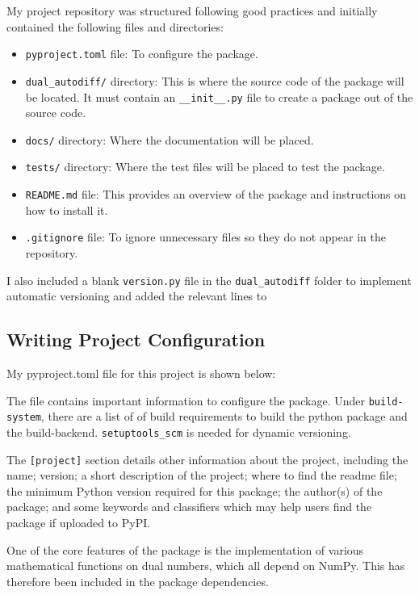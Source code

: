 \documentclass{article}
\begin{document}
My project repository was structured following good practices and initially contained the following files and directories:
\begin{itemize}
    \item \texttt{pyproject.toml} file: To configure the package.
    \item \texttt{dual\_autodiff/} directory: This is where the source code of the package will be located. It must contain an \texttt{\_\_init\_\_.py} file to create a package out of the source code.
    \item \texttt{docs/} directory: Where the documentation will be placed.
    \item \texttt{tests/} directory: Where the test files will be placed to test the package.
    \item \texttt{README.md} file: This provides an overview of the package and instructions on how to install it.
    \item \texttt{.gitignore} file: To ignore unnecessary files so they do not appear in the repository.
\end{itemize}

I also included a blank \texttt{version.py} file in the \texttt{dual\_autodiff} folder to implement automatic versioning and added the relevant lines to

\subsection{Writing Project Configuration}
My pyproject.toml file for this project is shown below:


The file contains important information to configure the package. Under \texttt{build-system}, there are a list of of build requirements to build the python package and the build-backend. \texttt{setuptools\_scm} is needed for dynamic versioning. 

The \texttt{[project]} section details other information about the project, including the name; version; a short description of the project; where to find the readme file; the minimum Python version required for this package; the author(s) of the package; and some keywords and classifiers which may help users find the package if uploaded to PyPI. 

One of the core features of the package is the implementation of various mathematical functions on dual numbers, which all depend on NumPy. This has therefore been included in the package dependencies.
\end{document}

